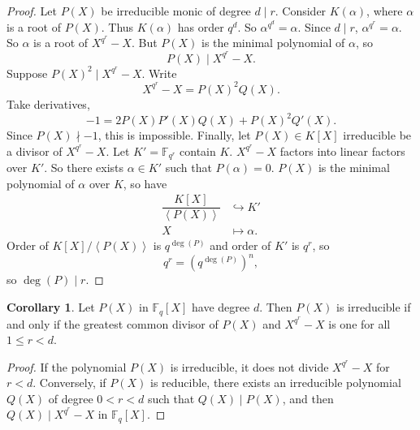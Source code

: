 \documentclass{article}
\newcommand{\F}{\mathbb{F}}
\newcommand{\rb}[1]{\left( #1 \right)}
\renewcommand{\sb}[1]{\left[ #1 \right]}
\newcommand{\ab}[1]{\left\langle #1 \right\rangle}
\theoremstyle{definition}\newtheorem{definition}{Definition}[subsection]
\theoremstyle{definition}\newtheorem{remark}[definition]{Remark}
\theoremstyle{definition}\newtheorem*{example}{Example}
\theoremstyle{definition}\newtheorem*{note}{Note}
\newtheorem{corollary}[definition]{Corollary}
\begin{document}
\begin{proof}
Let $ P\rb{X} $ be irreducible monic of degree $ d \mid r $. Consider $ K\rb{\alpha} $, where $ \alpha $ is a root of $ P\rb{X} $. Thus $ K\rb{\alpha} $ has order $ q^d $. So $ \alpha^{q^d} = \alpha $. Since $ d \mid r $, $ \alpha^{q^r} = \alpha $. So $ \alpha $ is a root of $ X^{q^r} - X $. But $ P\rb{X} $ is the minimal polynomial of $ \alpha $, so
$$ P\rb{X} \mid X^{q^r} - X. $$
Suppose $ P\rb{X}^2 \mid X^{q^r} - X $. Write
$$ X^{q^r} - X = P\rb{X}^2Q\rb{X}. $$
Take derivatives,
$$ -1 = 2P\rb{X}P'\rb{X}Q\rb{X} + P\rb{X}^2Q'\rb{X}. $$
Since $ P\rb{X} \nmid -1 $, this is impossible. Finally, let $ P\rb{X} \in K\sb{X} $ irreducible be a divisor of $ X^{q^r} - X $. Let $ K' = \F_{q^r} $ contain $ K $. $ X^{q^r} - X $ factors into linear factors over $ K' $. So there exists $ \alpha \in K' $ such that $ P\rb{\alpha} = 0 $. $ P\rb{X} $ is the minimal polynomial of $ \alpha $ over $ K $, so have
\begin{align*}
\dfrac{K\sb{X}}{\ab{P\rb{X}}} & \hookrightarrow K' \\
X & \mapsto \alpha.
\end{align*}
Order of $ K\sb{X} / \ab{P\rb{X}} $ is $ q^{\deg\rb{P}} $ and order of $ K' $ is $ q^r $, so
$$ q^r = \rb{q^{\deg\rb{P}}}^n, $$
so $ \deg\rb{P} \mid r $.
\end{proof}

\begin{corollary}
Let $ P\rb{X} $ in $ \F_q\sb{X} $ have degree $ d $. Then $ P\rb{X} $ is irreducible if and only if the greatest common divisor of $ P\rb{X} $ and $ X^{q^r} - X $ is one for all $ 1 \le r < d $.
\end{corollary}

\begin{proof}
If the polynomial $ P\rb{X} $ is irreducible, it does not divide $ X^{q^r} - X $ for $ r < d $. Conversely, if $ P\rb{X} $ is reducible, there exists an irreducible polynomial $ Q\rb{X} $ of degree $ 0 < r < d $ such that $ Q\rb{X} \mid P\rb{X} $, and then $ Q\rb{X} \mid X^{q^r} - X $ in $ \F_q\sb{X} $.
\end{proof}
\end{document}
